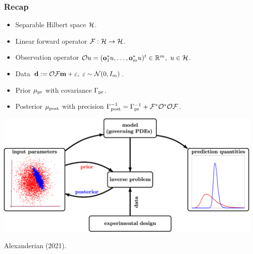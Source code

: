 \documentclass{beamer}
\begin{document}
\begin{frame}
\frametitle{Recap}

\begin{itemize}
\item Separable Hilbert space \(\mathcal{H}\).
\item Linear forward operator \(\mathcal{F}: \mathcal{H} \to \mathcal{H}\).
\item Observation operator \(\mathcal{O} u = (\mathbf{o}_1^*u, \dots, \mathbf{o}_m^*u )^t \in \mathbb{R}^m,\ u \in \mathcal{H}\).
\item Data \(\mathbf{d} := \mathcal{O} \mathcal{F} \mathbf{m} + \varepsilon,\ \varepsilon \sim \mathcal{N}(0,I_m)\).
\item Prior \(\mu_{\textup{pr}}\) with covariance \(\Gamma_{\textup{pr}}\).
\item Posterior \(\mu_{\textup{post}}\) with precision \(\Gamma_{\textup{post}}^{-1} = \Gamma_{\textup{pr}}^{-1} + \mathcal{F}^* \mathcal{O}^*\mathcal{O} \mathcal{F}\).
\end{itemize}
\end{frame}



\begin{frame}
  \begin{center}
    \includegraphics[width=\textwidth]{figs/bayesian_inverse_problems.jpg}
  \end{center}
  {\hfill \tiny Alexanderian (2021).}
\end{frame}
\end{document}

